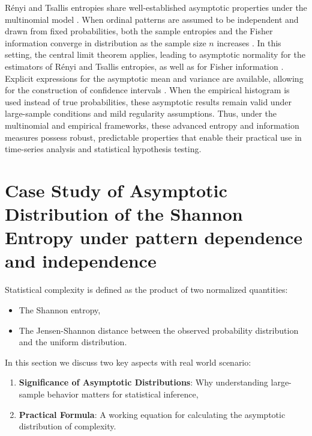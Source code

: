 
Rényi and Tsallis entropies share well-established asymptotic properties under the multinomial model \cite{Pardo1997, Rey2024, Rey2023}. When ordinal patterns are assumed to be independent and drawn from fixed probabilities, both the sample entropies and the Fisher information converge in distribution as the sample size $n$ increases \cite{Rey2024, Rey2023}. In this setting, the central limit theorem applies, leading to asymptotic normality for the estimators of Rényi and Tsallis entropies, as well as for Fisher information \cite{Bobkov2019, Rey2023}. Explicit expressions for the asymptotic mean and variance are available, allowing for the construction of confidence intervals \cite{Pardo1997, Rey2024}. When the empirical histogram is used instead of true probabilities, these asymptotic results remain valid under large-sample conditions and mild regularity assumptions. Thus, under the multinomial and empirical frameworks, these advanced entropy and information measures possess robust, predictable properties that enable their practical use in time-series analysis and statistical hypothesis testing.



\section{Case Study of Asymptotic Distribution of the Shannon Entropy under pattern dependence and independence} \label{Sec:CaseStudy} 

Statistical complexity is defined as the product of two normalized quantities:
\begin{itemize}
	\item The Shannon entropy,
	\item The Jensen-Shannon distance between the observed probability distribution and the uniform distribution. 
\end{itemize}

In this section we discuss two key aspects with real world scenario:
\begin{enumerate}
	\item \textbf{Significance of Asymptotic Distributions}: Why understanding large-sample behavior matters for statistical inference,
	\item \textbf{Practical Formula}: A working equation for calculating the asymptotic distribution of complexity.
\end{enumerate}

